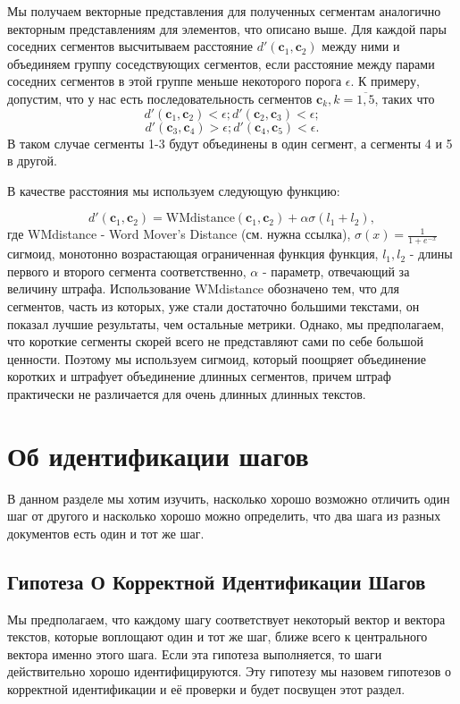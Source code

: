 \documentclass[12pt]{article}
\begin{document}
Мы получаем векторные представления для полученных сегментам аналогично векторным представлениям для элементов, что описано выше. Для каждой пары соседних сегментов высчитываем расстояние $d'(\textbf{c}_1, \textbf{c}_2)$ между ними и объединяем группу соседствующих сегментов, если расстояние между парами соседних сегментов в этой группе меньше некоторого порога $\epsilon$. К примеру, допустим, что у нас есть последовательность сегментов $\textbf{c}_k, k=\overline{1,5}$, таких что
$$d'(\textbf{c}_1, \textbf{c}_2)<\epsilon; d'(\textbf{c}_2, \textbf{c}_3)<\epsilon;$$
$$d'(\textbf{c}_3, \textbf{c}_4)>\epsilon; d'(\textbf{c}_4, \textbf{c}_5)<\epsilon.$$
В таком случае сегменты 1-3 будут объединены в один сегмент, а сегменты 4 и 5 в другой.

В качестве расстояния мы используем следующую функцию:

$$d'(\textbf{c}_1, \textbf{c}_2) = \text{WMdistance}(\textbf{c}_1, \textbf{c}_2) + \alpha\sigma(l_1+ l_2),$$
где WMdistance - Word Mover's Distance (см. нужна ссылка), $\sigma(x) = \frac{1}{1+e^{-x}}$ сигмоид, монотонно возрастающая ограниченная функция функция, $l_1, l_2$ - длины первого и второго сегмента соответственно, $\alpha$ - параметр, отвечающий за величину штрафа. Использование WMdistance обозначено тем, что для сегментов, часть из которых, уже стали достаточно большими текстами, он показал лучшие результаты, чем остальные метрики. Однако, мы предполагаем, что короткие сегменты скорей всего не представляют сами по себе большой ценности. Поэтому мы используем сигмоид, который поощряет объединение коротких и штрафует объединение длинных сегментов, причем штраф практически не различается для очень длинных длинных текстов.

\section{Об идентификации шагов}
\label{TheBest}

В данном разделе мы хотим изучить, насколько хорошо возможно отличить один шаг от другого и насколько хорошо можно определить, что два шага из разных документов есть один и тот же шаг. 

\subsection{Гипотеза О Корректной Идентификации Шагов}

Мы предполагаем, что каждому шагу соответствует некоторый вектор и вектора текстов, которые воплощают один и тот же шаг, ближе всего к центрального вектора именно этого шага. Если эта гипотеза выполняется, то шаги действительно хорошо идентифицируются. Эту гипотезу мы назовем гипотезов о корректной идентификации и её проверки и будет посвущен этот раздел.
\end{document}
